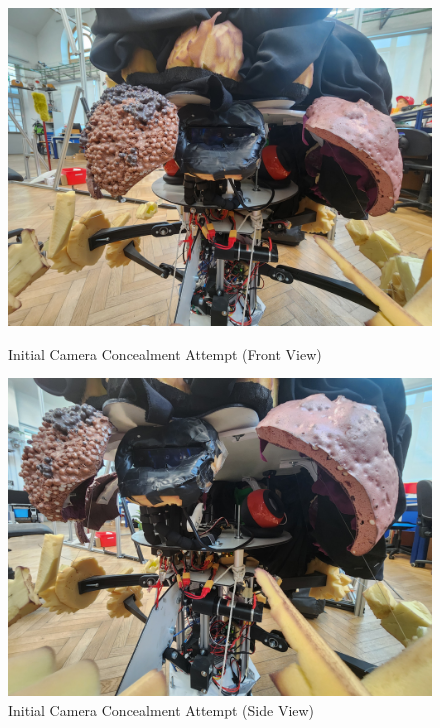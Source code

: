 \begin{figure}[H]
    \centering
    \begin{minipage}{0.45\textwidth}
        \centering
        \includegraphics[width=\textwidth]{Images/FirstTryCameraHiding.jpg}
        \caption{Initial Camera Concealment Attempt (Front View)}
        \label{fig:first_try_camera_hiding}
    \end{minipage}
    \hfill
    \begin{minipage}{0.45\textwidth}
        \centering
        \includegraphics[width=\textwidth]{Images/FirstTryCameraHiding (3).jpg}
        \caption{Initial Camera Concealment Attempt (Side View)}
        \label{fig:camera_hiding_mesh}
    \end{minipage}
\end{figure}

